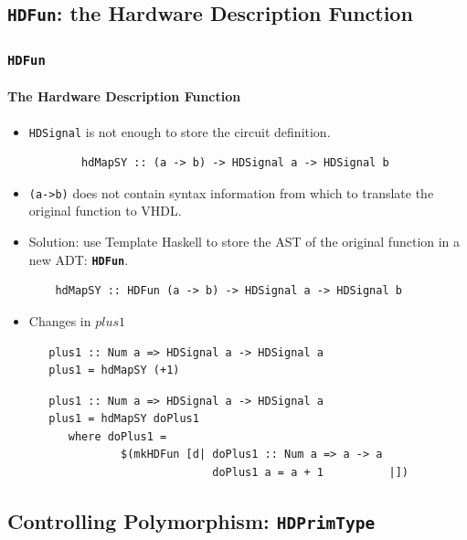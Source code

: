 \documentclass{beamer}
\begin{document}
\subsection{\texttt{HDFun}: the Hardware Description Function}

\begin{frame}[fragile]
  \frametitle{\texttt{HDFun}}
  \framesubtitle{The Hardware Description Function}
  \begin{itemize}
    \item \texttt{HDSignal} is not enough to store the
      circuit definition.
      \begin{lstlisting}
        hdMapSY :: (a -> b) -> HDSignal a -> HDSignal b
      \end{lstlisting}
    \item \texttt{(a->b)} does not contain syntax information from which 
      to translate the original function to VHDL.
\pause
    \item Solution: use Template Haskell to store the AST of the original
      function in a new ADT: \texttt{\textbf{HDFun}}.
      \begin{lstlisting}
    hdMapSY :: HDFun (a -> b) -> HDSignal a -> HDSignal b
      \end{lstlisting}
\pause
    \item Changes in $\mathit{plus1}$
\begin{overprint}
\begin{lstlisting}
   plus1 :: Num a => HDSignal a -> HDSignal a
   plus1 = hdMapSY (+1)
\end{lstlisting}
\begin{lstlisting}
   plus1 :: Num a => HDSignal a -> HDSignal a 
   plus1 = hdMapSY doPlus1
      where doPlus1 = 
              $(mkHDFun [d| doPlus1 :: Num a => a -> a
                            doPlus1 a = a + 1          |])
\end{lstlisting}
\end{overprint}
      
    \end{itemize}  
\end{frame}


\subsection{Controlling Polymorphism: \texttt{HDPrimType}}
\end{document}
